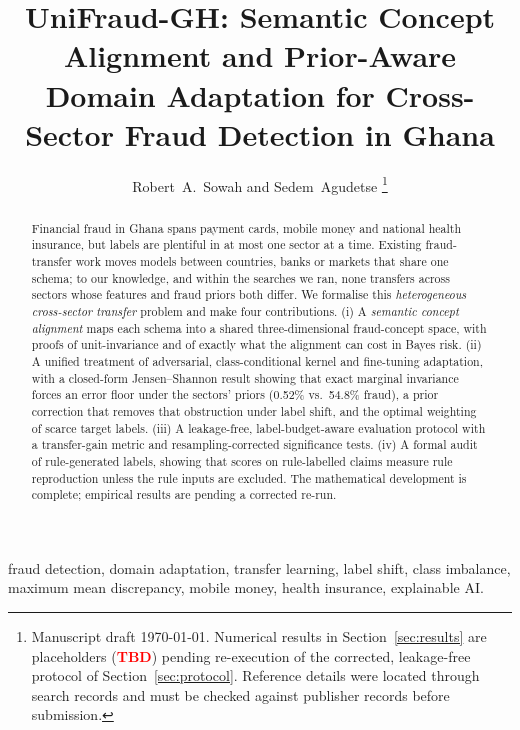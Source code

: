 \documentclass[journal]{IEEEtran}
\newcommand{\TBD}{\textcolor{red}{\textbf{TBD}}}
\newcommand{\1}{\mathbf{1}}
\begin{document}
\title{UniFraud-GH: Semantic Concept Alignment and Prior-Aware Domain Adaptation for Cross-Sector Fraud Detection in Ghana}

\author{Robert~A.~Sowah and Sedem~Agudetse%
\thanks{Manuscript draft \today. Numerical results in Section~\ref{sec:results} are placeholders (\TBD) pending re-execution of the corrected, leakage-free protocol of Section~\ref{sec:protocol}. Reference details were located through search records and must be checked against publisher records before submission.}}

\maketitle

\begin{abstract}
Financial fraud in Ghana spans payment cards, mobile money and national health insurance, but labels are plentiful in at most one sector at a time. Existing fraud-transfer work moves models between countries, banks or markets that share one schema; to our knowledge, and within the searches we ran, none transfers across sectors whose features and fraud priors both differ. We formalise this \emph{heterogeneous cross-sector transfer} problem and make four contributions. (i) A \emph{semantic concept alignment} maps each schema into a shared three-dimensional fraud-concept space, with proofs of unit-invariance and of exactly what the alignment can cost in Bayes risk. (ii) A unified treatment of adversarial, class-conditional kernel and fine-tuning adaptation, with a closed-form Jensen--Shannon result showing that exact marginal invariance forces an error floor under the sectors' priors (0.52\% vs.\ 54.8\% fraud), a prior correction that removes that obstruction under label shift, and the optimal weighting of scarce target labels. (iii) A leakage-free, label-budget-aware evaluation protocol with a transfer-gain metric and resampling-corrected significance tests. (iv) A formal audit of rule-generated labels, showing that scores on rule-labelled claims measure rule reproduction unless the rule inputs are excluded. The mathematical development is complete; empirical results are pending a corrected re-run.
\end{abstract}

\begin{IEEEkeywords}
fraud detection, domain adaptation, transfer learning, label shift, class imbalance, maximum mean discrepancy, mobile money, health insurance, explainable AI.
\end{IEEEkeywords}
\end{document}
